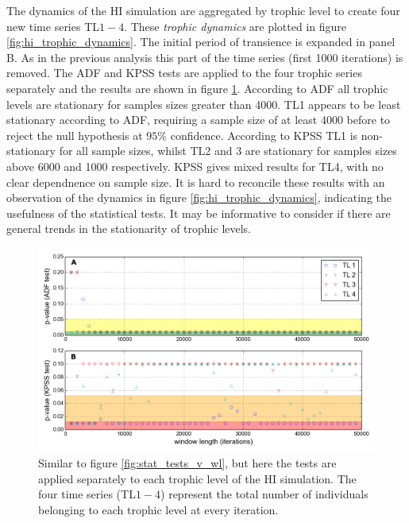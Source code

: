 The dynamics of the HI simulation are aggregated by trophic level to create four new time series TL$1-4$. These \emph{trophic dynamics} are plotted in figure \ref{fig:hi_trophic_dynamics}. The initial period of transience is expanded in panel B. As in the previous analysis this part of the time series (first 1000 iterations) is removed. The ADF and KPSS tests are applied to the four trophic series separately and the results are shown in figure \ref{fig:tl_stat_tests_v_wl}. According to ADF all trophic levels are stationary for samples sizes greater than 4000. TL1 appears to be least stationary according to ADF, requiring a sample size of at least 4000 before to reject the null hypothesis at $95\%$ confidence. According to KPSS TL1 is non-stationary for all sample sizes, whilst TL2 and 3 are stationary for samples sizes above 6000 and 1000 respectively. KPSS gives mixed results for TL4, with no clear dependnence on sample size. It is hard to reconcile these results with an observation of the dynamics in figure \ref{fig:hi_trophic_dynamics}, indicating the usefulness of the statistical tests. It may be informative to consider if there are general trends in the stationarity of trophic levels.

\begin{figure}[h!]
	\centering
	\includegraphics[width=0.8\linewidth]{"./chapters/chapter04b/figures/Rtests/tl_stat_tests_v_wl"}
     \caption{Similar to figure \ref{fig:stat_tests_v_wl}, but here the tests are applied separately to each trophic level of the HI simulation. The four time series (TL$1-4$) represent the total number of individuals belonging to each trophic level at every iteration.} 
     \label{fig:tl_stat_tests_v_wl}   
\end{figure}

